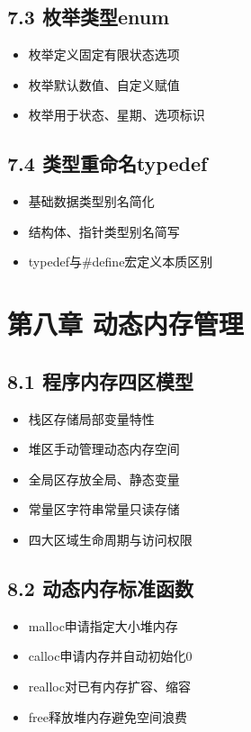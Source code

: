\subsection*{7.3 枚举类型enum}
\begin{itemize}
\item 枚举定义固定有限状态选项
\item 枚举默认数值、自定义赋值
\item 枚举用于状态、星期、选项标识
\end{itemize}

\subsection*{7.4 类型重命名typedef}
\begin{itemize}
\item 基础数据类型别名简化
\item 结构体、指针类型别名简写
\item typedef与\#define宏定义本质区别
\end{itemize}

\section*{第八章 动态内存管理}
\subsection*{8.1 程序内存四区模型}
\begin{itemize}
\item 栈区存储局部变量特性
\item 堆区手动管理动态内存空间
\item 全局区存放全局、静态变量
\item 常量区字符串常量只读存储
\item 四大区域生命周期与访问权限
\end{itemize}

\subsection*{8.2 动态内存标准函数}
\begin{itemize}
\item malloc申请指定大小堆内存
\item calloc申请内存并自动初始化0
\item realloc对已有内存扩容、缩容
\item free释放堆内存避免空间浪费
\end{itemize}

